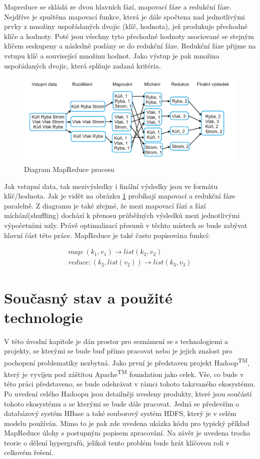 \documentclass[thesis=M,czech]{FITthesis}[2012/06/26]
\begin{document}
Mapreduce se skládá ze dvou hlavních fází, mapovací fáze a redukční fáze. Nejdříve je spuštěna mapovací funkce, která je dále spočtena nad jednotlivými prvky z množiny uspořádaných dvojic (klíč, hodnota), jež produkuje přechodné klíče a hodnoty.\cite{HadoopDG}
Poté jsou všechny tyto přechodné hodnoty asociované se stejným klíčem seskupeny a následně poslány se do redukční fáze. Redukční fáze přijme na vstupu klíč a související množinu hodnot. Jako výstup je pak množina uspořádaných dvojic, která splňuje zadaná kritéria.
\begin{figure}[h]\centering
	\includegraphics[width=1\textwidth, angle=0]			{files/MapReduce}
	\caption[Diagram MapReduce procesu]{Diagram MapReduce procesu}\label{fig:mapred}
\end{figure} 

Jak vstupní data, tak mezivýsledky i finální výsledky jsou ve formátu klíč/hodnota. Jak je vidět na obrázku \ref{fig:mapred} probíhají mapovací a redukční fáze paralelně. Z diagramu je také zřejmé, že mezi mapovací fází a fází míchání(shuffling) dochází k přenosu průběžných výsledků mezi jednotlivými výpočetními uzly. Právě optimalizací přesunů v těchto místech se bude zabývat hlavní část této práce. 
MapReduce je také často popisována funkcí: 

\begin{eqnarray}
	map: (k_1, v_1) \rightarrow  list(k_2, v_2) \nonumber \\
	reduce: (k_2, list(v_2)) \rightarrow list(k_3, v_3) \nonumber 
\end{eqnarray}



\chapter{Současný stav a použité technologie}
V této úvodní kapitole je dán prostor pro seznámení se s technologiemi a projekty, se kterými se bude buď přímo pracovat nebo je jejich znalost pro pochopení problematiky nezbytná. Jako první je představen projekt Hadoop\textsuperscript{TM}, který je vyvíjen pod záštitou Apache\textsuperscript{TM} foundation jako celek. Vše, co bude v této práci představeno, se bude odehrávat v rámci tohoto takzvaného ekosystému. Po uvedení celého Hadoopu jsou detailněji uvedeny produkty, které jsou součástí tohoto ekosystému a se kterými se bude dále pracovat. Jedná se především o databázový systém HBase a také souborový systém HDFS, který je v celém modelu používán. Mimo to je pak zde uvedena ukázka kódu pro typický příklad MapReduce úlohy s postupným popisem zpracování. Na závěr je uvedena trocha teorie o dělení hypergrafů, jelikož tento problém bude hrát klíčovou roli v celkovém řešení.
\end{document}
